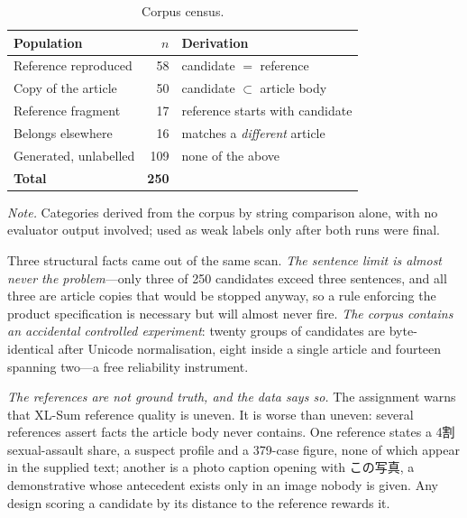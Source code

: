\documentclass[conference]{IEEEtran}
\newcommand{\tabnote}[1]{%
  \par\vspace{2.5pt}%
  \noindent\parbox{\columnwidth}{\raggedright\scriptsize #1\par}}
\begin{document}
\vspace{-0.5cm}

\begin{table}[htbp]
\caption{Corpus census.}
\label{tab:census}
\vspace{-0.3cm}
\centering
\begin{tabularx}{\columnwidth}{@{}p{27mm}rY@{}}
\toprule
\textbf{Population} & \textbf{$n$} & \textbf{Derivation} \\
\midrule
Reference reproduced   & 58  & candidate $=$ reference \\
Copy of the article    & 50  & candidate $\subset$ article body \\
Reference fragment     & 17  & reference starts with candidate \\
Belongs elsewhere      & 16  & matches a \emph{different} article \\
Generated, unlabelled  & 109 & none of the above \\
\midrule
\textbf{Total}         & \textbf{250} & \\
\bottomrule
\end{tabularx}
\tabnote{\textit{Note.} Categories derived from the corpus by string
comparison alone, with no evaluator output involved; used as weak labels
only after both runs were final.}
\vspace{-0.5cm}
\end{table}

Three structural facts came out of the same scan.
\emph{The sentence limit is almost never the problem}---only three of 250
candidates exceed three sentences, and all three are article copies that
would be stopped anyway, so a rule enforcing the product specification is
necessary but will almost never fire. \emph{The corpus contains an
accidental controlled experiment}: twenty groups of candidates are
byte-identical after Unicode normalisation, eight inside a single article
and fourteen spanning two---a free reliability instrument.

\emph{The references are not ground truth, and the data says so.} The
assignment warns that XL-Sum reference quality is uneven. It is worse
than uneven: several references assert facts the article body never
contains. One reference states a 4割 sexual-assault share, a suspect
profile and a 379-case figure, none of which appear in the supplied text;
another is a photo caption opening with \mbox{この写真}, a demonstrative whose
antecedent exists only in an image nobody is given. Any design scoring a candidate by its distance to the reference
rewards it.
\end{document}
